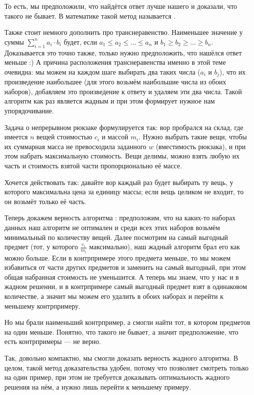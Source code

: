 То есть, мы предположили, что найдётся ответ лучше нашего и доказали, что такого не бывает. В математике такой метод называется .

Также стоит немного дополнить про транснеравенство. Наименьшее значение у суммы $\sum\limits_{i = 1}^{n} a_i \cdot b_i$ будет, если $a_1 \leq a_2 \leq \ldots \leq a_n$ и $b_1 \geq b_2 \geq \ldots \geq b_n$. Доказывается это точно также, только нужно предположить, что нашёлся ответ меньше :) А причина расположения транснеравенства именно в этой теме очевидна: мы можем на каждом шаге выбирать два таких числа ($a_i$ и $b_j$), что их произведение наибольшее (для этого возьмём наибольшие числа из обоих наборов), добавляем это произведение к ответу и удаляем эти два числа. Такой алгоритм как раз является жадным и при этом формирует нужное нам упорядочивание.


Задача о непрерывном рюкзаке формулируется так: вор пробрался на склад, где имеется $n$ вещей стоимостью $c_i$ и массой $m_i$. Нужно выбрать такие вещи, чтобы их суммарная масса не превосходила заданного $w$ (вместимость рюкзака), и при этом набрать максимальную стоимость. Вещи делимы, можно взять любую их часть и стоимость взятой части пропорционально её массе.

Хочется действовать так: давайте вор каждый раз будет выбирать ту вещь, у которого максимальна цена за единицу массы; если вещь целиком не входит, то он возьмёт только её часть.

Теперь докажем верность алгоритма : предположим, что на каких-то наборах данных наш алгоритм не оптимален и среди всех этих наборов возьмём минимальный по количеству вещей. Далее посмотрим на самый выгодный предмет (тот, у которого $\frac{c_i}{m_i}$ максимально), наш жадный алгоритм брал его как можно больше. Если в контрпримере этого предмета меньше, то мы можем избавиться от части других предметов и заменить на самый выгодный, при этом общая набранная стоимость не уменьшится. А теперь мы знаем, что у нас и в жадном решении, и в контрпримере самый выгодный предмет взят в одинаковом количестве, а значит мы можем его удалить в обоих наборах и перейти к меньшему контрпримеру.

Но мы брали наименьший контрпример, а смогли найти тот, в котором предметов на один меньше. Понятно, что такого не бывает, а значит предположение, что есть контрпримеры — не верно.

Так, довольно компактно, мы смогли доказать верность жадного алгоритма. В целом, такой метод доказательства удобен, потому что позволяет смотреть только на один пример, при этом не требуется доказывать оптимальность жадного решения на нём, а нужно лишь перейти к меньшему примеру.

